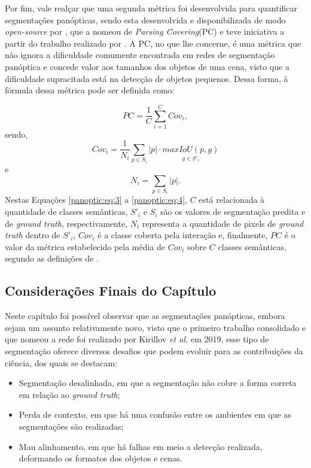 Por fim, vale realçar que uma segunda métrica foi desenvolvida para quantificar segmentações panópticas, sendo esta desenvolvida e disponibilizada de modo \textit{open-source} por \cite{Yang2019}, que a nomeou de \textit{Parsing Covering}(PC) e teve iniciativa a partir do trabalho realizado por \cite{Arbelaez2011}. A PC, no que lhe concerne, é uma métrica que não ignora a dificuldade comumente encontrada em redes de segmentação panóptica e concede valor aos tamanhos dos objetos de uma cena, visto que a dificuldade supracitada está na detecção de objetos pequenos. Dessa forma, à fórmula dessa métrica pode ser definida como:

\begin{equation}
    \label{panoptic:eq:3}
    PC = \frac{1}{C} \underset{i=1}{\overset{C}{\sum}}Cov_i,
\end{equation}
sendo,
\begin{equation}
    \label{panoptic:eq:4}
    Cov_i = \frac{1}{N_i}\underset{p \in S_i}{\sum} |p|\cdot \underset{g \in S'_i}{max IoU(p,g)}
\end{equation}
e
\begin{equation}
    \label{panoptic:eq:5}
    N_i = \underset{p \in S_i}{\sum} |p|.
\end{equation}
Nestas Equações \ref{panoptic:eq:3} a \ref{panoptic:eq:4}, $C$ está relacionada à quantidade de classes semânticas, $S'_i$ e $S_i$ são os valores de segmentação predita e de \textit{ground truth}, respectivamente, $N_i$ representa a quantidade de pixels de \textit{ground truth} dentro de $S'_i$, $Cov_i$ é a classe coberta pela interação e, finalmente, $PC$ é o valor da métrica estabelecido pela média de $Cov_i$ sobre $C$ classes semânticas, segundo as definições de \cite{Yang2019}.


\subsection{Considerações Finais do Capítulo}
\label{panoptic:conclusion}
Neste capítulo foi possível observar que as segmentações panópticas, embora sejam um assunto relativamente novo, visto que o primeiro trabalho consolidado e que nomeou a rede foi realizado por Kirillov \textit{et al.} \cite{Kirillov2019a} em 2019, esse tipo de segmentação oferece diversos desafios que podem evoluir para as contribuições da ciência, dos quais se destacam:
 
 \begin{itemize}
     \item Segmentação desalinhada, em que a segmentação não cobre a forma correta em relação ao \textit{ground truth};
     \item Perda de contexto, em que há uma confusão entre os ambientes em que as segmentações são realizadas;
     \item Mau alinhamento, em que há falhas em meio a detecção realizada, deformando os formatos dos objetos e cenas.
 \end{itemize}

